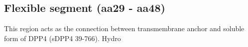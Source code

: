 \subsection{Flexible segment (aa29 - aa48)}

This region acts as the connection between transmembrane anchor and soluble form of DPP4 (sDPP4 39-766). Hydro
